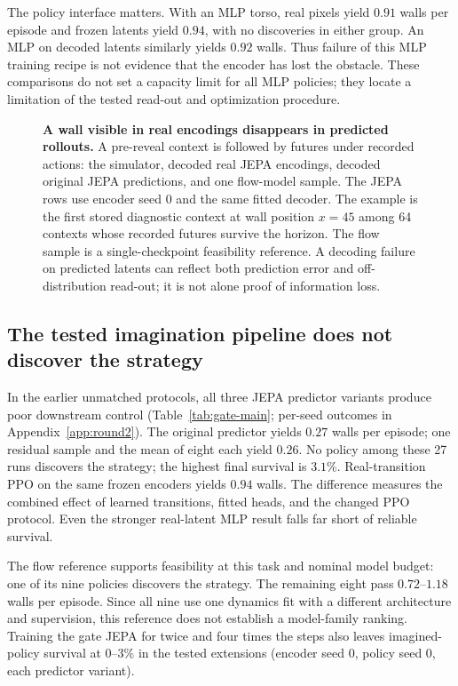 The policy interface matters. With an MLP torso, real pixels yield $0.91$ walls per episode and
frozen latents yield $0.94$, with no discoveries in either group. An MLP on decoded latents similarly
yields $0.92$ walls. Thus failure of this MLP training recipe is not evidence that the encoder has
lost the obstacle. These comparisons do not set a capacity limit for all MLP policies; they locate
a limitation of the tested read-out and optimization procedure.

\begin{figure}[t]
\centering
{}
\caption{\textbf{A wall visible in real encodings disappears in predicted rollouts.} A pre-reveal
context is followed by futures under recorded actions: the simulator, decoded real JEPA encodings,
decoded original JEPA predictions, and one flow-model sample. The JEPA rows use encoder seed 0
and the same fitted decoder. The example is the first stored diagnostic context at wall position
$x=45$ among 64 contexts whose recorded futures survive the horizon. The flow sample is a single-checkpoint feasibility reference.
A decoding failure on predicted latents can reflect both prediction error and off-distribution
read-out; it is not alone proof of information loss.}
\label{fig:rollouts}
\end{figure}

\subsection{The tested imagination pipeline does not discover the strategy}
\label{app:results-ppo}
\label{app:results}

In the earlier unmatched protocols, all three JEPA predictor variants produce poor downstream control
(Table~\ref{tab:gate-main}; per-seed outcomes in Appendix~\ref{app:round2}). The original predictor yields $0.27$ walls
per episode; one residual sample and the mean of eight each yield $0.26$. No policy among these
27 runs discovers the strategy; the highest final survival is $3.1\%$. Real-transition PPO on the
same frozen encoders yields $0.94$ walls. The difference measures the combined effect of learned
transitions, fitted heads, and the changed PPO protocol. Even the stronger real-latent MLP result
falls far short of reliable survival.

The flow reference supports feasibility at this task and nominal model budget: one of its nine
policies discovers the strategy. The remaining eight pass $0.72$--$1.18$ walls per episode. Since
all nine use one dynamics fit with a different architecture and supervision, this reference does
not establish a model-family ranking. Training the gate JEPA for twice and four times the steps
also leaves imagined-policy survival at $0$--$3\%$ in the tested extensions (encoder seed 0, policy
seed 0, each predictor variant).

